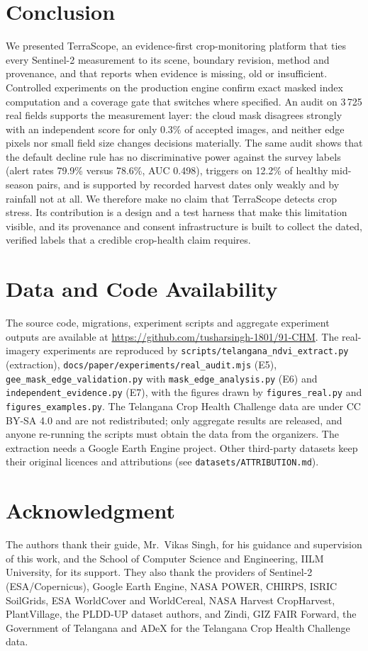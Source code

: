 \documentclass[conference]{IEEEtran}
\begin{document}
\section{Conclusion}
We presented TerraScope, an evidence-first crop-monitoring platform that ties every Sentinel-2 measurement to its scene, boundary revision, method and provenance, and that reports when evidence is missing, old or insufficient. Controlled experiments on the production engine confirm exact masked index computation and a coverage gate that switches where specified. An audit on 3\,725 real fields supports the measurement layer: the cloud mask disagrees strongly with an independent score for only 0.3\% of accepted images, and neither edge pixels nor small field size changes decisions materially. The same audit shows that the default decline rule has no discriminative power against the survey labels (alert rates 79.9\% versus 78.6\%, AUC 0.498), triggers on 12.2\% of healthy mid-season pairs, and is supported by recorded harvest dates only weakly and by rainfall not at all. We therefore make no claim that TerraScope detects crop stress. Its contribution is a design and a test harness that make this limitation visible, and its provenance and consent infrastructure is built to collect the dated, verified labels that a credible crop-health claim requires.

\section*{Data and Code Availability}
The source code, migrations, experiment scripts and aggregate experiment outputs are available at \url{https://github.com/tusharsingh-1801/91-CHM}. The real-imagery experiments are reproduced by \texttt{scripts/telangana\_ndvi\_extract.py} (extraction), \texttt{docs/paper/experiments/real\_audit.mjs} (E5), \texttt{gee\_mask\_edge\_validation.py} with \texttt{mask\_edge\_analysis.py} (E6) and \texttt{independent\_evidence.py} (E7), with the figures drawn by \texttt{figures\_real.py} and \texttt{figures\_examples.py}. The Telangana Crop Health Challenge data are under CC BY-SA 4.0 and are not redistributed; only aggregate results are released, and anyone re-running the scripts must obtain the data from the organizers. The extraction needs a Google Earth Engine project. Other third-party datasets keep their original licences and attributions (see \texttt{datasets/ATTRIBUTION.md}).

\section*{Acknowledgment}
The authors thank their guide, Mr.~Vikas Singh, for his guidance and supervision of this work, and the School of Computer Science and Engineering, IILM University, for its support. They also thank the providers of Sentinel-2 (ESA/Copernicus), Google Earth Engine, NASA POWER, CHIRPS, ISRIC SoilGrids, ESA WorldCover and WorldCereal, NASA Harvest CropHarvest, PlantVillage, the PLDD-UP dataset authors, and Zindi, GIZ FAIR Forward, the Government of Telangana and ADeX for the Telangana Crop Health Challenge data.



\end{document}
